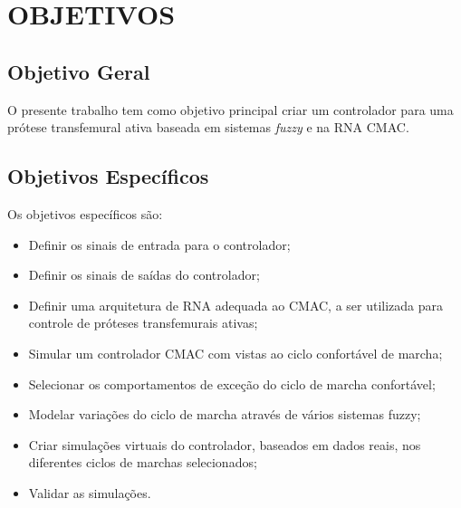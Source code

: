 \section[OBJETIVOS]{OBJETIVOS}

\subsection[Objetivo Geral]{\textbf{Objetivo Geral}}
O presente trabalho tem como objetivo principal criar um controlador para uma prótese transfemural ativa baseada em sistemas \emph{fuzzy} e na RNA CMAC.

\subsection[Objetivo Específicos]{\textbf{Objetivos Específicos}}
Os objetivos específicos são:
\begin{itemize}
	\item Definir os sinais de entrada para o controlador;
	\item Definir os sinais de saídas do controlador;
	\item Definir uma arquitetura de RNA adequada ao CMAC, a ser utilizada para controle de próteses transfemurais ativas;
	\item Simular um controlador CMAC com vistas ao ciclo confortável de marcha;
	\item Selecionar os comportamentos de exceção do ciclo de marcha confortável;
	\item Modelar variações do ciclo de marcha através de vários sistemas fuzzy;
	\item Criar simulações virtuais do controlador, baseados em dados reais, nos diferentes ciclos de marchas selecionados;
	\item Validar as simulações.
\end{itemize}
